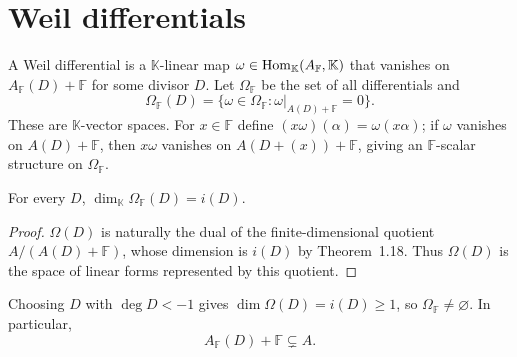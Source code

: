 \section{Weil differentials}
\begin{definition}
\label{par-def-weil-differential}
\uses{}
A Weil differential is a $\mathbb K$-linear map
$\omega\in\operatorname{Hom}_{\mathbb K}(A_{\mathbb F},\mathbb K)$ that vanishes on
$A_{\mathbb F}(D)+\mathbb F$ for some divisor $D$. Let $\Omega_{\mathbb F}$ be
the set of all differentials and
\[
\Omega_{\mathbb F}(D)=\{\omega\in\Omega_{\mathbb F}:\omega|_{A(D)+\mathbb F}=0\}.
\]
These are $\mathbb K$-vector spaces. For $x\in\mathbb F$ define
$(x\omega)(\alpha)=\omega(x\alpha)$; if $\omega$ vanishes on $A(D)+\mathbb F$,
then $x\omega$ vanishes on $A(D+(x))+\mathbb F$, giving an $\mathbb F$-scalar
structure on $\Omega_{\mathbb F}$.
\end{definition}

\begin{lemma}
\label{par-lem-differential-dimension}
\uses{}
For every $D$, $\dim_{\mathbb K}\Omega_{\mathbb F}(D)=i(D)$.
\end{lemma}
\begin{proof}
$\Omega(D)$ is naturally the dual of the finite-dimensional quotient
$A/(A(D)+\mathbb F)$, whose dimension is $i(D)$ by Theorem~1.18.
Thus $\Omega(D)$ is the space of linear forms represented by this quotient.
\end{proof}

\begin{remark}
\label{par-rem-differentials-nonempty}
\uses{}
Choosing $D$ with $\deg D<-1$ gives $\dim\Omega(D)=i(D)\geq1$, so
\(\Omega_{\mathbb F}\neq\varnothing\).  In particular,
\[
A_{\mathbb F}(D)+\mathbb F\subsetneq A.
\]
\end{remark}

